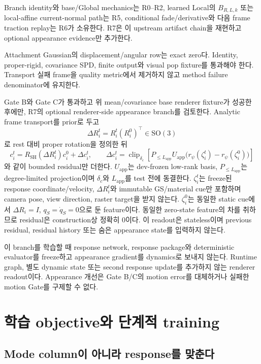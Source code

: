 \documentclass[11pt]{article}
\begin{document}
Branch identity와 base/Global mechanics는 R0--R2, learned Local의 \(B_{R,L,k}\) 또는 local-affine
current-normal path는 R5, conditional fade/derivative와 다음 frame traction replay는 R6가 소유한다.
R7은 이 upstream artifact chain을 재현하고 optional appearance evidence만 추가한다.

Attachment Gaussian의 displacement/angular row는 exact zero다. Identity, proper-rigid, covariance SPD,
finite output와 visual pop fixture를 통과해야 한다. Transport 실패 frame을 quality metric에서 제거하지 않고
method failure denominator에 유지한다.

Gate B와 Gate C가 통과하고 위 mean/covariance base renderer fixture가 성공한 후에만,
R7의 optional renderer-side appearance branch를 검토한다. Analytic frame transport를 prior로 두고
\[
  \Delta R_i^t=R_i^t(R_i^0)^\top\in\mathrm{SO}(3)
\]
로 rest 대비 proper rotation을 정의한 뒤
\begin{equation}
  c_i^t=R_{\mathrm{SH}}(\Delta R_i^t)c_i^0+\Delta c_i^t,
  \qquad
  \Delta c_i^t=
  \operatorname{clip}_{\delta_c}\!\left[
  P_{\le L_{\mathrm{app}}}U_{\mathrm{app}}
  \bigl(r_\psi(\zeta_i^t)-r_\psi(\zeta_i^0)\bigr)\right]
  \label{eq:rd-optional-appearance}
\end{equation}
와 같이 bounded residual만 더한다. \(U_{\mathrm{app}}\)는 dev-frozen low-rank basis,
\(P_{\le L_{\mathrm{app}}}\)는 degree-limited projection이며 \(\delta_c\)와 \(L_{\mathrm{app}}\)를 test 전에
동결한다. \(\zeta_i^t\)는 freeze된 response coordinate/velocity, \(\Delta R_i^t\)와 immutable
GS/material cue만 포함하며 camera pose, view direction, raster target을 받지 않는다.
\(\zeta_i^0\)는 동일한 static cue에서 \(\Delta R_i=I\), \(q_S=\dot q_S=0\)으로 둔 feature이다.
동일한 zero-state feature의 차를 취하므로 residual은 construction상 정확히 0이다. 이 readout은
stateless이며 previous residual, residual history 또는 숨은 appearance state를 입력하지 않는다.

이 branch를 학습할 때 response network, response package와 deterministic evaluator를 freeze하고
appearance gradient를 dynamics로 보내지 않는다. Runtime graph, 별도 dynamic state 또는 second response update를
추가하지 않는 renderer readout이다. Appearance 개선은 Gate B/C의 motion error를 대체하거나
실패한 motion Gate를 구제할 수 없다.

\section{학습 objective와 단계적 training}

\subsection{Mode column이 아니라 response를 맞춘다}
\end{document}
